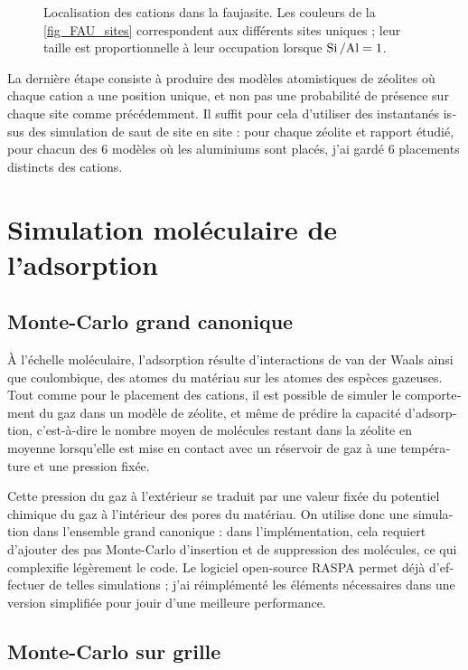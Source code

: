 \documentclass[thesis]{subfiles}
\begin{document}
\begin{otherlanguage}{french}
\begin{figure}[ht]
	\caption{Localisation des cations dans la faujasite. Les couleurs de la \cref{fig_FAU_sites} correspondent aux différents sites uniques ; leur taille est proportionnelle à leur occupation lorsque $\mbox{Si\,/Al} = 1$.}\label{fig_FAU}
\end{figure}

La dernière étape consiste à produire des modèles atomistiques de zéolites où chaque cation a une position unique, et non pas une probabilité de présence sur chaque site comme précédemment. Il suffit pour cela d'utiliser des instantanés issus des simulation de saut de site en site : pour chaque zéolite et rapport \SiAl étudié, pour chacun des 6 modèles où les aluminiums sont placés, j'ai gardé 6 placements distincts des cations.


\section{Simulation moléculaire de l'adsorption}

\subsection{Monte-Carlo grand canonique}

À l'échelle moléculaire, l'adsorption résulte d'interactions de van der Waals ainsi que coulombique, des atomes du matériau sur les atomes des espèces gazeuses. Tout comme pour le placement des cations, il est possible de simuler le comportement du gaz dans un modèle de zéolite, et même de prédire la capacité d'adsorption, c'est-à-dire le nombre moyen de molécules restant dans la zéolite en moyenne lorsqu'elle est mise en contact avec un réservoir de gaz à une température et une pression fixée.

Cette pression du gaz à l'extérieur se traduit par une valeur fixée du potentiel chimique du gaz à l'intérieur des pores du matériau. On utilise donc une simulation dans l'ensemble grand canonique : dans l'implémentation, cela requiert d'ajouter des pas Monte-Carlo d'insertion et de suppression des molécules, ce qui complexifie légèrement le code. Le logiciel open-source RASPA \autocite{RASPA} permet déjà d'effectuer de telles simulations ; j'ai réimplémenté les éléments nécessaires dans une version simplifiée pour jouir d'une meilleure performance.

\subsection{Monte-Carlo sur grille}


\end{otherlanguage}
\end{document}
